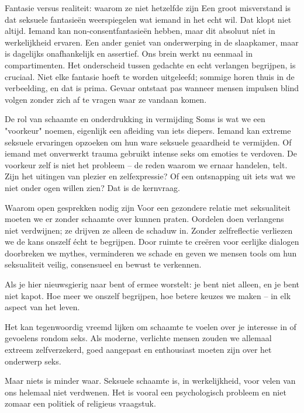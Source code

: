 Fantasie versus realiteit: waarom ze niet hetzelfde zijn
Een groot misverstand is dat seksuele fantasieën weerspiegelen wat iemand in het echt wil. Dat klopt niet altijd. Iemand kan non-consentfantasieën hebben, maar dit absoluut níet in werkelijkheid ervaren. Een ander geniet van onderwerping in de slaapkamer, maar is dagelijks onafhankelijk en assertief. Ons brein werkt nu eenmaal in compartimenten. Het onderscheid tussen gedachte en echt verlangen begrijpen, is cruciaal. Niet elke fantasie hoeft te worden uitgeleefd; sommige horen thuis in de verbeelding, en dat is prima. Gevaar ontstaat pas wanneer mensen impulsen blind volgen zonder zich af te vragen waar ze vandaan komen.

De rol van schaamte en onderdrukking in vermijding
Soms is wat we een "voorkeur" noemen, eigenlijk een afleiding van iets diepers. Iemand kan extreme seksuele ervaringen opzoeken om hun ware seksuele geaardheid te vermijden. Of iemand met onverwerkt trauma gebruikt intense seks om emoties te verdoven. De voorkeur zelf is niet het probleem – de reden waarom we ernaar handelen, telt. Zijn het uitingen van plezier en zelfexpressie? Of een ontsnapping uit iets wat we niet onder ogen willen zien? Dat is de kernvraag.

Waarom open gesprekken nodig zijn
Voor een gezondere relatie met seksualiteit moeten we er zonder schaamte over kunnen praten. Oordelen doen verlangens niet verdwijnen; ze drijven ze alleen de schaduw in. Zonder zelfreflectie verliezen we de kans onszelf écht te begrijpen. Door ruimte te creëren voor eerlijke dialogen doorbreken we mythes, verminderen we schade en geven we mensen tools om hun seksualiteit veilig, consensueel en bewust te verkennen.

Als je hier nieuwsgierig naar bent of ermee worstelt: je bent niet alleen, en je bent niet kapot. Hoe meer we onszelf begrijpen, hoe betere keuzes we maken – in elk aspect van het leven.

Het kan tegenwoordig vreemd lijken om schaamte te voelen over je interesse in of gevoelens rondom seks. Als moderne, verlichte mensen zouden we allemaal extreem zelfverzekerd, goed aangepast en enthousiast moeten zijn over het onderwerp seks.

Maar niets is minder waar. Seksuele schaamte is, in werkelijkheid, voor velen van ons helemaal niet verdwenen. Het is vooral een psychologisch probleem en niet zomaar een politiek of religieus vraagstuk.

